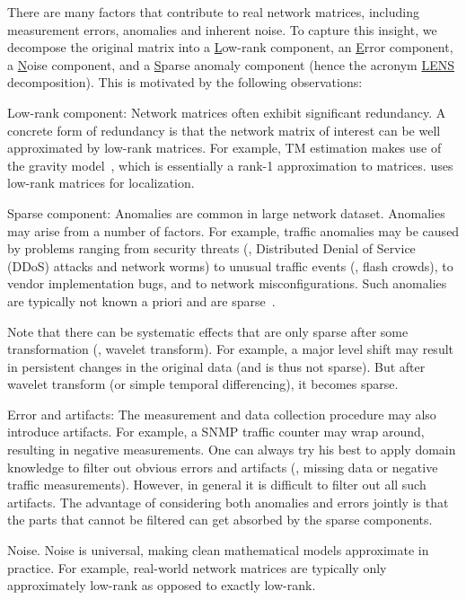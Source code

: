  There are many factors that contribute to
real network matrices, including measurement errors, anomalies and
inherent noise.  To capture this insight, we decompose the
original matrix into a {\underline L}ow-rank component, an
{\underline E}rror component, a {\underline N}oise component, and a
{\underline S}parse anomaly component (hence the acronym
{\underline{LENS}} decomposition). This is motivated by the following
observations:
\begin{sitemize}
\item Low-rank component: Network matrices often exhibit significant redundancy.
A concrete form of redundancy is that the network matrix of interest
can be well approximated by low-rank matrices.  For example, TM
estimation makes use of the gravity model~\cite{ZRDG03}, which is
essentially a rank-1
approximation to matrices. \cite{mobile-localization}
uses low-rank matrices for localization.
\item Sparse component: Anomalies are common in large network dataset.
  Anomalies may arise from a number of factors. For example,
  traffic anomalies may be caused by problems ranging from security
  threats (\eg, Distributed Denial of Service (DDoS) attacks and
  network worms) to unusual traffic events (\eg, flash crowds), to
  vendor implementation bugs, and to network misconfigurations.  Such
  anomalies are typically not known a priori and are sparse~\cite{anomaly_sparsity, anomaly_sparsity2}.


Note that there can be systematic effects that are only
sparse after some transformation (\eg, wavelet transform).  For
example, a major level shift may result in persistent changes in the
original data (and is thus not sparse).  But after wavelet transform
(or simple temporal differencing), it becomes sparse. 

\item Error and artifacts: The measurement and data collection procedure
may also introduce artifacts. For example, a SNMP traffic counter may wrap
around, resulting in negative measurements.
One can always try his best to apply domain knowledge to filter out
obvious errors and artifacts (\eg, missing data or negative traffic
measurements).  However, in general it is difficult to filter out all
such artifacts.  The advantage of considering both anomalies and
errors jointly is that the parts that cannot be filtered can get
absorbed by the sparse components.

\item Noise.  Noise is universal, making clean mathematical models
approximate in practice. For example, real-world network matrices are
typically only approximately low-rank as opposed to exactly low-rank.

\end{sitemize}


